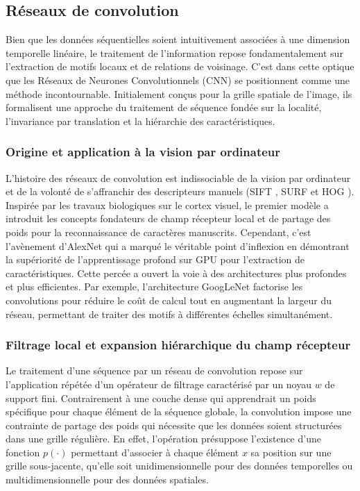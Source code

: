 \subsection{Réseaux de convolution}
Bien que les données séquentielles soient intuitivement associées à une dimension temporelle linéaire, le traitement de l'information repose fondamentalement sur l'extraction de motifs locaux et de relations de voisinage. C'est dans cette optique que les Réseaux de Neurones Convolutionnels (CNN) se positionnent comme une méthode incontournable. Initialement conçus pour la grille spatiale de l'image, ils formalisent une approche du traitement de séquence fondée sur la localité, l'invariance par translation et la hiérarchie des caractéristiques.

\subsubsection{Origine et application à la vision par ordinateur}
L'histoire des réseaux de convolution est indissociable de la vision par ordinateur et de la volonté de s'affranchir des descripteurs manuels  (SIFT \cite{lowe_distinctive_2004}, SURF \cite{bay_surf_2006} et HOG \cite{dalal_histograms_2005}). Inspirée par les travaux biologiques sur le cortex visuel, le premier modèle \cite{lecun_gradient-based_2002} a introduit les concepts fondateurs de champ récepteur local et de partage des poids pour la reconnaissance de caractères manuscrits. Cependant, c'est l'avènement d'AlexNet \cite{krizhevsky_imagenet_2012} qui a marqué le véritable point d'inflexion en démontrant la supériorité de l'apprentissage profond sur GPU pour l'extraction de caractéristiques. Cette percée a ouvert la voie à des architectures plus profondes et plus efficientes. Par exemple, l'architecture GoogLeNet \cite{szegedy_going_2015} factorise les convolutions pour réduire le coût de calcul tout en augmentant la largeur du réseau, permettant de traiter des motifs à différentes échelles simultanément.


\subsubsection{Filtrage local et expansion hiérarchique du champ récepteur}
Le traitement d'une séquence par un réseau de convolution repose sur l'application répétée d'un opérateur de filtrage caractérisé par un noyau $w$ de support fini. Contrairement à une couche dense qui apprendrait un poids spécifique pour chaque élément de la séquence globale, la convolution impose une contrainte de partage des poids qui nécessite que les données soient structurées dans une grille régulière. En effet, l'opération présuppose l'existence d'une fonction $p(\cdot)$ permettant d'associer à chaque élément $x$ sa position sur une grille sous-jacente, qu'elle soit unidimensionnelle pour des données temporelles ou multidimensionnelle pour des données spatiales.\\


